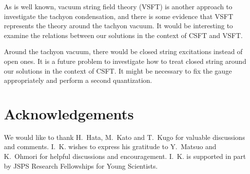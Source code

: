 \documentclass[a4paper,seceq,preprint]{ptptex}
\begin{document}
As is well known, vacuum string field theory (VSFT)
\cite{rf:VSFT1,rf:VSFT2} is 
another approach to investigate the tachyon condensation, and there is
some evidence that VSFT represents the theory around the tachyon
vacuum. \cite{rf:Okawa} 
It would be interesting to examine the relations between our
solutions in the context of CSFT and VSFT. 

Around the tachyon vacuum, there would be closed string excitations
instead of open ones. 
It is a future problem to investigate how to treat closed string around
our solutions in the context of CSFT. It might be necessary to fix the
gauge appropriately and perform a second quantization. 



\section*{Acknowledgements}
We would like to thank H.~Hata, M.~Kato and T.~Kugo for valuable
discussions and comments. 
I.~K. wishes to express his gratitude to Y.~Matsuo and K.~Ohmori for helpful discussions and encouragement.
I.~K. is supported in part by JSPS Research Fellowships for Young Scientists.


%
\end{document}

